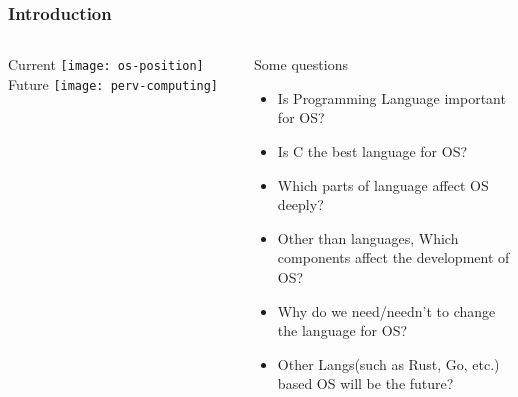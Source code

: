 %
%
\begin{frame}[plain]
	\frametitle{Introduction}
	
	
	
	\begin{columns}
		
		\begin{column}{.3\textwidth}
			\centering
			Current
			\texttt{[image: os-position]}
			Future
			\texttt{[image: perv-computing]}
		\end{column}
		
		\begin{column}{.7\textwidth}
			
			\Large
			Some questions
			\begin{itemize}
				\item  Is Programming Language important for OS?
				\item Is C  the best language for OS?
				\item Which parts of language affect OS deeply?
				\item Other than languages, Which components affect the development of OS? 
				\item Why do we need/needn't to change the language for OS?	
				\item Other Langs(such as Rust, Go, etc.) based OS will be the future?			
			\end{itemize}
			
		\end{column}
		
		
	\end{columns}
	
	
\end{frame}

